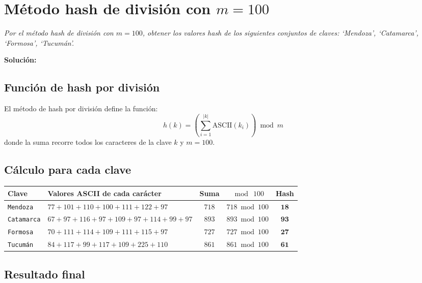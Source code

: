 \documentclass[12pt]{article}
\newcommand{\solucion}{%
    \vspace{0.8em}\textbf{Solución:}\par\vspace{0.4em}%
}
\begin{document}
\newpage
\section{Método hash de división con $m = 100$}

\textit{Por el método hash de división con $m=100$, obtener los valores hash
de los siguientes conjuntos de claves: `Mendoza', `Catamarca', `Formosa', `Tucumán'.}

\solucion

\subsection*{Función de hash por división}

El método de hash por división define la función:
\[
  h(k) = \left(\sum_{i=1}^{|k|} \text{ASCII}(k_i)\right) \bmod m
\]
donde la suma recorre todos los caracteres de la clave $k$ y $m = 100$.

\subsection*{Cálculo para cada clave}

\begin{center}
\begin{tabular}{lp{6cm}ccc}
\toprule
\textbf{Clave} & \textbf{Valores ASCII de cada carácter} & \textbf{Suma} & $\bmod\ 100$ & \textbf{Hash} \\
\midrule
\texttt{Mendoza}
  & $77 + 101 + 110 + 100 + 111 + 122 + 97$
  & $718$ & $718 \bmod 100$ & $\mathbf{18}$ \\[6pt]
\texttt{Catamarca}
  & $67 + 97 + 116 + 97 + 109 + 97 + 114 + 99 + 97$
  & $893$ & $893 \bmod 100$ & $\mathbf{93}$ \\[6pt]
\texttt{Formosa}
  & $70 + 111 + 114 + 109 + 111 + 115 + 97$
  & $727$ & $727 \bmod 100$ & $\mathbf{27}$ \\[6pt]
\texttt{Tucum\'an}
  & $84 + 117 + 99 + 117 + 109 + 225 + 110$
  & $861$ & $861 \bmod 100$ & $\mathbf{61}$ \\
\bottomrule
\end{tabular}
\end{center}

\subsection*{Resultado final}
\end{document}
